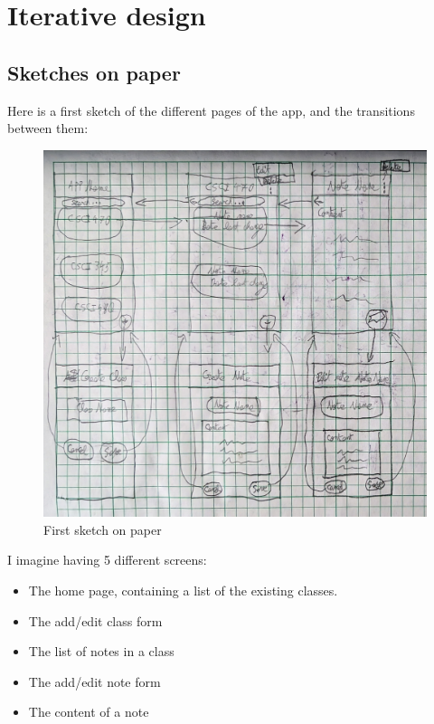 \documentclass[]{article}
\begin{document}
	\pagebreak
	
	\section{Iterative design}
	
	\subsection{Sketches on paper}
	
	Here is a first sketch of the different pages of the app, and the transitions between them:
	
	\begin{figure}[!htb]
		\centering
		\includegraphics[scale=0.1]{first_sketch}
		\caption{First sketch on paper}
	\end{figure}
	
	I imagine having 5 different screens:
	
	\begin{itemize}
		\item The home page, containing a list of the existing classes.
		\item The add/edit class form
		\item The list of notes in a class
		\item The add/edit note form
		\item The content of a note
	\end{itemize}
	
\end{document}

